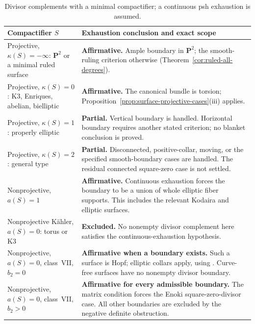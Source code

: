 \documentclass[11pt]{amsart}
\theoremstyle{definition}
\theoremstyle{remark}
\numberwithin{equation}{section}
\newcommand{\PP}{\mathbf P}
\begin{document}
\begin{table}[!htbp]
\caption{Divisor complements with a minimal compactifier; a continuous psh exhaustion is assumed.}
\label{tab:surface-status}
\small
\renewcommand{\arraystretch}{1.16}
\begin{tabularx}{\textwidth}{@{}>{\raggedright\arraybackslash}p{}>{\raggedright\arraybackslash}X@{}}
\toprule
Compactifier $S$ & Exhaustion conclusion and exact scope\\
\midrule
Projective, $\kappa(S)=-\infty$: $\PP^2$ or a minimal ruled surface
& \textbf{Affirmative.} Ample boundary in $\PP^2$; the smooth-ruling
criterion otherwise (Theorem~\ref{cor:ruled-all-degrees}).\\
\addlinespace
Projective, $\kappa(S)=0$: K3, Enriques, abelian, bielliptic
& \textbf{Affirmative.} The canonical bundle is torsion;
Proposition~\ref{prop:surface-projective-cases}\textup{(iii)} applies.\\
\addlinespace
Projective, $\kappa(S)=1$: properly elliptic
& \textbf{Partial.} Vertical boundary is handled. Horizontal boundary
requires another stated criterion; no blanket conclusion is proved.\\
\addlinespace
Projective, $\kappa(S)=2$: general type
& \textbf{Partial.} Disconnected, positive-collar, moving, or the
specified smooth-boundary cases are handled. The residual connected
square-zero case is not settled.\\
\midrule
Nonprojective, $a(S)=1$
& \textbf{Affirmative.} Continuous exhaustion forces the boundary to be
a union of whole elliptic fiber supports. This includes the relevant
Kodaira and elliptic surfaces.\\
\addlinespace
Nonprojective K\"ahler, $a(S)=0$: torus or K3
& \textbf{Excluded.} No nonempty divisor complement here satisfies
the continuous-exhaustion hypothesis.\\
\addlinespace
Nonprojective, $a(S)=0$, class~VII, $b_2=0$
& \textbf{Affirmative when a boundary exists.} Such a surface is Hopf;
elliptic collars apply, using \cite{CFSTZ2026}. Curve-free surfaces
have no nonempty divisor boundary.\\
\addlinespace
Nonprojective, $a(S)=0$, class~VII, $b_2>0$
& \textbf{Affirmative for every admissible boundary.} The matrix
condition forces the Enoki square-zero-divisor case. All other
boundaries are excluded by the negative definite obstruction.\\
\bottomrule
\end{tabularx}
\end{table}
\FloatBarrier
\end{document}
